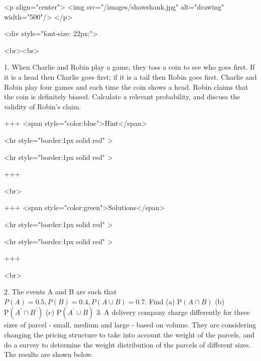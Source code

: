 <p align="center">
<img src="/images/shawshank.jpg" alt="drawing" width="500"/>
</p>

<div style="font-size: 22px;">

<br><br>

1. When Charlie and Robin play a game, they toss a coin to see who goes first. If it is a head then Charlie goes first; if it is a tail then Robin goes first. Charlie and Robin play four games and each time the coin shows a head. Robin claims that the coin is definitely biased. Calculate a relevant probability, and discuss the validity of Robin's claim.

+++ <span style="color:blue">Hint</span>

<hr style="border:1px solid red" >

<hr style="border:1px solid red" >

+++

<br>

+++ <span style="color:green">Solutions</span>

<hr style="border:1px solid red" >

<hr style="border:1px solid red" >

+++

<br>

2. The events A and B are such that $P(A)=0.5, P(B)=0.4, P(A \cup B)=0.7$. Find
(a) $\mathrm{P}(A \cap B)$
(b) $\mathrm{P}\left(A^{\prime} \cap B^{\prime}\right)$
(c) $\mathrm{P}\left(A^{\prime} \cup B\right)$
3. A delivery company charge differently for three sizes of parcel - small, medium and large - based on volume. They are considering changing the pricing structure to take into account the weight of the parcels, and do a survey to determine the weight distribution of the parcels of different sizes. The results are shown below.

